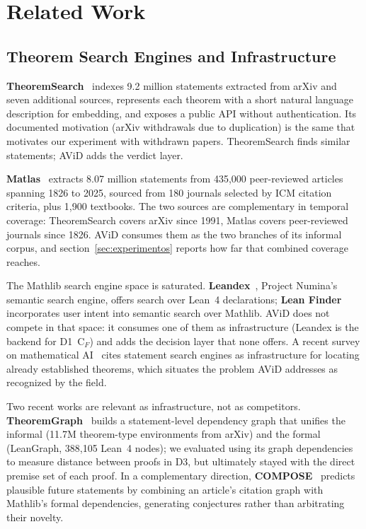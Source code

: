 \documentclass[12pt,a4paper]{article}
\theoremstyle{remark}
\begin{document}
\section{Related Work}

\label{sec:related}

\subsection{Theorem Search Engines and Infrastructure}

\textbf{TheoremSearch}~\cite{theoremsearch2026} indexes 9.2 million statements extracted from arXiv and seven additional sources, represents each theorem with a short natural language description for embedding, and exposes a public API without authentication. Its documented motivation (arXiv withdrawals due to duplication) is the same that motivates our experiment with withdrawn papers. TheoremSearch finds similar statements; AViD adds the verdict layer.

\textbf{Matlas}~\cite{matlas2026} extracts 8.07 million statements from 435,000 peer-reviewed articles spanning 1826 to 2025, sourced from 180 journals selected by ICM citation criteria, plus 1,900 textbooks. The two sources are complementary in temporal coverage: TheoremSearch covers arXiv since 1991, Matlas covers peer-reviewed journals since 1826. AViD consumes them as the two branches of its informal corpus, and section~\ref{sec:experimentos} reports how far that combined coverage reaches.

The Mathlib search engine space is saturated. \textbf{Leandex}~\cite{leandex2026}, Project Numina's semantic search engine, offers search over Lean~4 declarations; \textbf{Lean Finder}~\cite{leanfinder2025} incorporates user intent into semantic search over Mathlib. AViD does not compete in that space: it consumes one of them as infrastructure (Leandex is the backend for D1~C$_F$) and adds the decision layer that none offers. A recent survey on mathematical AI~\cite{survey2026} cites statement search engines as infrastructure for locating already established theorems, which situates the problem AViD addresses as recognized by the field.

Two recent works are relevant as infrastructure, not as competitors. \textbf{TheoremGraph}~\cite{theoremgraph2026} builds a statement-level dependency graph that unifies the informal (11.7M theorem-type environments from arXiv) and the formal (LeanGraph, 388,105 Lean~4 nodes); we evaluated using its graph dependencies to measure distance between proofs in D3, but ultimately stayed with the direct premise set of each proof. In a complementary direction, \textbf{COMPOSE}~\cite{compose2026} predicts plausible future statements by combining an article's citation graph with Mathlib's formal dependencies, generating conjectures rather than arbitrating their novelty.
\end{document}
